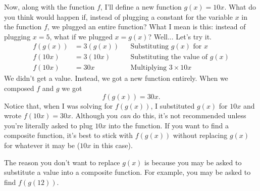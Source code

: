 Now, along with the function $f$, I'll define a new function $g(x) = 10x$. What do you think would happen if, instead of plugging a constant for the variable $x$ in the function $f$, we plugged an entire function? What I mean is this: instead of plugging $x = 5$, what if we plugged $x = g(x)$? Well... Let's try it.
\begin{align*}
    f(g(x)) &= 3(g(x)) && \text{Substituting $g(x)$ for $x$}\\
    f(10x) &= 3(10x) && \text{Substituting the value of $g(x)$}\\
    f(10x) &= 30x && \text{Multiplying $3 \times 10x$}
\end{align*}
We didn't get a value. Instead, we got a new function entirely. When we composed $f$ and $g$ we got
\[
f(g(x)) = 30x \text{.}
\]
Notice that, when I was solving for $f(g(x))$, I substituted $g(x)$ for $10x$ and wrote $f(10x) = 30x$. Although you \textit{can} do this, it's not recommended unless you're literally asked to plug $10x$ into the function. If you want to find a composite function, it's best to stick with $f(g(x))$ without replacing $g(x)$ for whatever it may be ($10x$ in this case).

The reason you don't want to replace $g(x)$ is because you may be asked to substitute a value into a composite function. For example, you may be asked to find $f(g(12))$.

